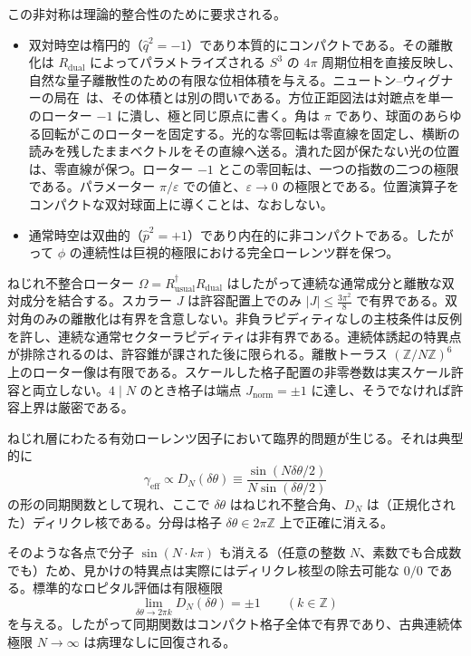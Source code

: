 \documentclass[a4paper]{article}
\newcommand{\Jnorm}{J_{\mathrm{norm}}}
\newcommand{\Jbound}{\frac{3\pi^2}{8}}
\begin{document}
この非対称は理論的整合性のために要求される。
\begin{itemize}
  \item 双対時空は楕円的（$\hat{q}^2 = -1$）であり本質的にコンパクトである。その離散化は $R_{\text{dual}}$ によってパラメトライズされる $S^3$ の $4\pi$ 周期位相を直接反映し、自然な量子離散性のための有限な位相体積を与える。ニュートン--ウィグナーの局在~\cite{newtonwigner1949}は、その体積とは別の問いである。方位正距図法は対蹠点を単一のローター $-1$ に潰し、極と同じ原点に書く。角は $\pi$ であり、球面のあらゆる回転がこのローターを固定する。光的な零回転は零直線を固定し、横断の読みを残したままベクトルをその直線へ送る。潰れた図が保たない光の位置は、零直線が保つ。ローター $-1$ とこの零回転は、一つの指数の二つの極限である。パラメーター $\pi/\varepsilon$ での値と、$\varepsilon\to 0$ の極限とである。位置演算子をコンパクトな双対球面上に導くことは、なおしない。
  \item 通常時空は双曲的（$\hat{p}^2 = +1$）であり内在的に非コンパクトである。したがって $\phi$ の連続性は巨視的極限における完全ローレンツ群を保つ。
\end{itemize}

ねじれ不整合ローター $\Omega = R_{\text{usual}}^\dagger R_{\text{dual}}$ はしたがって連続な通常成分と離散な双対成分を結合する。スカラー $J$ は許容配置上でのみ $|J|\le\Jbound$ で有界である。双対角のみの離散化は有界を含意しない。非負ラピディティなしの主枝条件は反例を許し、連続な通常セクターラピディティは非有界である。連続体誘起の特異点が排除されるのは、許容錐が課された後に限られる。離散トーラス $(\mathbb{Z}/N\mathbb{Z})^6$ 上のローター像は有限である。スケールした格子配置の非零巻数は実スケール許容と両立しない。$4\mid N$ のとき格子は端点 $\Jnorm=\pm 1$ に達し、そうでなければ許容上界は厳密である。

ねじれ層にわたる有効ローレンツ因子において臨界的問題が生じる。それは典型的に
\[
\gamma_{\text{eff}} \propto D_N(\delta\theta) \equiv \frac{\sin(N \delta\theta / 2)}{N \sin(\delta\theta / 2)}
\]
の形の同期関数として現れ、ここで $\delta\theta$ はねじれ不整合角、$D_N$ は（正規化された）ディリクレ核である。分母は格子 $\delta\theta \in 2\pi \mathbb{Z}$ 上で正確に消える。

そのような各点で分子 $\sin(N \cdot k\pi)$ も消える（任意の整数 $N$、素数でも合成数でも）ため、見かけの特異点は実際にはディリクレ核型の除去可能な $0/0$ である。標準的なロピタル評価は有限極限
\[
\lim_{\delta\theta \to 2\pi k} D_N(\delta\theta) = \pm 1 \qquad (k \in \mathbb{Z})
\]
を与える。したがって同期関数はコンパクト格子全体で有界であり、古典連続体極限 $N \to \infty$ は病理なしに回復される。
\end{document}

